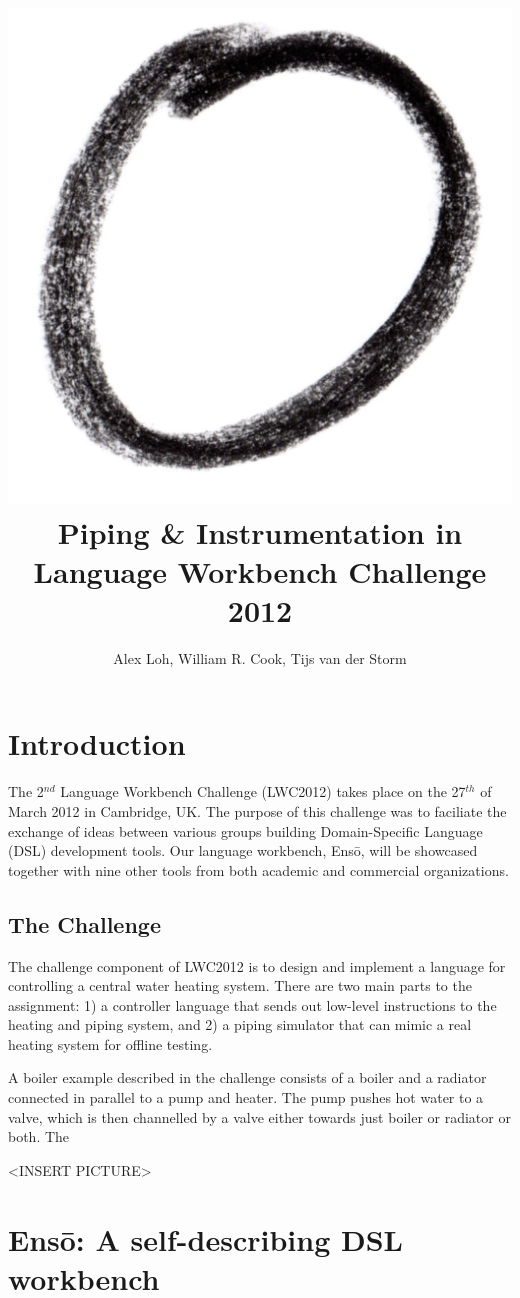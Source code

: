 \documentclass[11pt]{article}
\title{\includegraphics[scale=0.25]{enso.jpg}\\ Piping \& Instrumentation in \Enso \\
   Language Workbench Challenge 2012}
\author{Alex Loh, William R. Cook, Tijs van der Storm}
\newcommand{\comments}[1]{}
\def\Enso{Ens\={o}\xspace}
\begin{document}
\maketitle

\begin{abstract}

\end{abstract}

\section{Introduction}

The 2$^{nd}$ Language Workbench Challenge (LWC2012) takes place on the 27$^{th}$ of March 2012 in Cambridge, UK. The purpose of this challenge was to faciliate the exchange of ideas between various groups building Domain-Specific Language (DSL) development tools. Our language workbench, \Enso, will be showcased together with nine other tools from both academic and commercial organizations.

\subsection{The Challenge}

The challenge component of LWC2012 is to design and implement a language for controlling a central water heating system. There are two main parts to the assignment: 1) a controller language that sends out low-level instructions to the heating and piping system, and 2) a piping simulator that can mimic a real heating system for offline testing.

A boiler example described in the challenge consists of a boiler and a radiator connected in parallel to a pump and heater. The pump pushes hot water to a valve, which is then channelled by a valve either towards just boiler or radiator or both. The 

<INSERT PICTURE>

\section{\Enso: A self-describing DSL workbench}

\comments{
- Key characteristics
  - Self-describing
    - 'everything is a language' (don't say this; say "language-oriented programming")
    - dsl tools can be used at both levels
    - auto-bootstrapped from meta-metamodel
      - metametamodel can be changed (even dynamically)
  - Interpreter vs code generation
    - avoid one level of indirection to: 
      - sidestep round-tripping issues
      - easier to build tools (correctness,  that depend on the run-time
  - Decouple editing from internal representation
    - representation freedom
- Key weakness
  - no IDE
    - leverage Ruby's debugging capabilities
}
\end{document}
